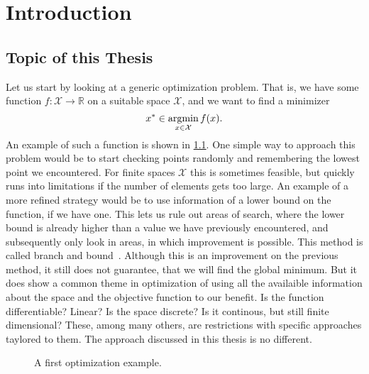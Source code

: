 \chapter{Introduction}\label{chap:intro}
%
%
\section{Topic of this Thesis}
Let us start by looking at a generic optimization problem. That is, we have some function \( f \colon \mathcal{X} \to \mathbb{R} \) on a suitable space $\mathcal{X}$, and we want to find a minimizer
\[
    x^{*} \in \operatorname*{argmin}_{x \in \mathcal{X}} f(x).
\]
An example of such a function is shown in \cref{fig:optimization_intro}.
One simple way to approach this problem would be to start checking points randomly and remembering the lowest point we encountered. 
For finite spaces $\mathcal{X}$ this is sometimes feasible, but quickly runs into limitations if the number of elements gets too large.
% 
An example of a more refined strategy would be to use information of a lower bound on the function, if we have one. 
This lets us rule out areas of search, where the lower bound is already higher than a value we have previously encountered, and subsequently only look in areas, in which improvement is possible. 
This method is called branch and bound~\cite{lawler1966branch}.
Although this is an improvement on the previous method, it still does not guarantee, that we will find the global minimum.
% 
But it does show a common theme in optimization of using all the availaible information about the space and the objective function to our benefit. Is the function differentiable? Linear? Is the space discrete? Is it continous, but still finite dimensional? These, among many others, are restrictions with specific approaches taylored to them. The approach discussed in this thesis is no different. 
\begin{figure}[H]
    \centering
    
    \caption{A first optimization example.}
    \label{fig:optimization_intro}
\end{figure}


